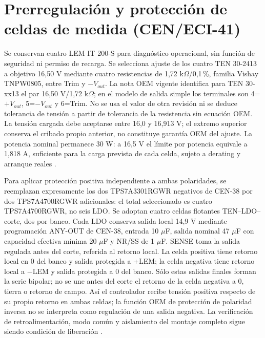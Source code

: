 \section{Prerregulación y protección de celdas de medida (CEN/ECI-41)}
\label{sec:sd4-proteccion-cen41}
Se conservan cuatro LEM IT 200-S para diagnóstico operacional, sin función de seguridad ni permiso de recarga. Se selecciona ajuste de los cuatro TEN 30-2413 a objetivo 16,50 V mediante cuatro resistencias de 1,72 k$\Omega$/0,1\,\%, familia Vishay TNPW0805, entre Trim y $-V_{out}$. La nota OEM vigente identifica para TEN 30-xx13 el par 16,50 V/1,72 k$\Omega$; en el modelo de salida simple los terminales son 4=$+V_{out}$, 5=$-V_{out}$ y 6=Trim. No se usa el valor de otra revisión ni se deduce tolerancia de tensión a partir de tolerancia de la resistencia sin ecuación OEM. La tensión cargada debe aceptarse entre 16,0 y 16,913 V; el extremo superior conserva el cribado propio anterior, no constituye garantía OEM del ajuste. La potencia nominal permanece 30 W: a 16,5 V el límite por potencia equivale a 1,818 A, suficiente para la carga prevista de cada celda, sujeto a derating y arranque reales \parencites[pp.~1--2]{lote41-trim}[pp.~1,3--5]{lote35-ten30}[pp.~1--3]{lote41-tnpw}.

Para aplicar protección positiva independiente a ambas polaridades, se reemplazan expresamente los dos TPS7A3301RGWR negativos de CEN-38 por dos TPS7A4700RGWR adicionales: el total seleccionado es cuatro TPS7A4700RGWR, no seis LDO. Se adoptan cuatro celdas flotantes TEN--LDO--corte, dos por banco. Cada LDO conserva salida local 14,9 V mediante programación ANY-OUT de CEN-38, entrada 10 $\mu$F, salida nominal 47 $\mu$F con capacidad efectiva mínima 20 $\mu$F y NR/SS de 1 $\mu$F. SENSE toma la salida regulada antes del corte, referida al retorno local. La celda positiva tiene retorno local en 0 del banco y salida protegida a +LEM; la celda negativa tiene retorno local a $-\mathrm{LEM}$ y salida protegida a 0 del banco. Sólo estas salidas finales forman la serie bipolar; no se une antes del corte el retorno de la celda negativa a 0, tierra o retorno de campo. Así el controlador recibe tensión positiva respecto de su propio retorno en ambas celdas; la función OEM de protección de polaridad inversa no se interpreta como regulación de una salida negativa. La verificación de retroalimentación, modo común y aislamiento del montaje completo sigue siendo condición de liberación \parencites[pp.~3--6 y 14--18]{lote38-positive}[pp.~2--4 y 7--10]{lote41-ltc}[pp.~5,10--11]{lote35-lem200}.

